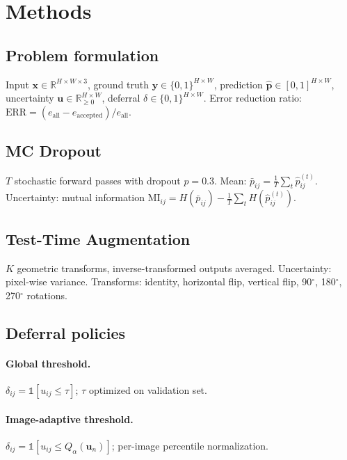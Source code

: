 \documentclass[review,3p]{elsarticle}
\begin{document}
\section{Methods}

\subsection{Problem formulation}

Input $\mathbf{x} \in \mathbb{R}^{H \times W \times 3}$, ground truth
$\mathbf{y} \in \{0,1\}^{H \times W}$, prediction $\hat{\mathbf{p}} \in
[0,1]^{H \times W}$, uncertainty $\mathbf{u} \in \mathbb{R}_{\geq 0}^{H
\times W}$, deferral $\delta \in \{0,1\}^{H \times W}$. Error reduction
ratio: $\text{ERR} = (e_{\text{all}} - e_{\text{accepted}}) / e_{\text{all}}$.

\subsection{MC Dropout}

$T$ stochastic forward passes with dropout $p = 0.3$. Mean:
$\bar{p}_{ij} = \frac{1}{T}\sum_t \hat{p}_{ij}^{(t)}$. Uncertainty:
mutual information $\text{MI}_{ij} = H(\bar{p}_{ij}) - \frac{1}{T}
\sum_t H(\hat{p}_{ij}^{(t)})$.

\subsection{Test-Time Augmentation}

$K$ geometric transforms, inverse-transformed outputs averaged. Uncertainty:
pixel-wise variance. Transforms: identity, horizontal flip, vertical flip,
90$^\circ$, 180$^\circ$, 270$^\circ$ rotations.

\subsection{Deferral policies}

\paragraph{Global threshold.}
$\delta_{ij} = \mathbb{1}[u_{ij} \leq \tau]$; $\tau$ optimized on
validation set.

\paragraph{Image-adaptive threshold.}
$\delta_{ij} = \mathbb{1}[u_{ij} \leq Q_\alpha(\mathbf{u}_n)]$; per-image
percentile normalization.
\end{document}
